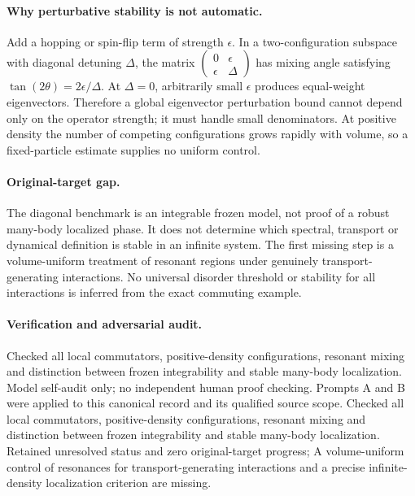\documentclass[11pt]{article}
\begin{document}
\paragraph{Why perturbative stability is not automatic.} Add a hopping or spin-flip term of strength $\epsilon$. In a two-configuration subspace with diagonal detuning $\Delta$, the matrix $\left(\begin{smallmatrix}0&\epsilon\\\epsilon&\Delta\end{smallmatrix}\right)$ has mixing angle satisfying $\tan(2\theta)=2\epsilon/\Delta$. At $\Delta=0$, arbitrarily small $\epsilon$ produces equal-weight eigenvectors. Therefore a global eigenvector perturbation bound cannot depend only on the operator strength; it must handle small denominators. At positive density the number of competing configurations grows rapidly with volume, so a fixed-particle estimate supplies no uniform control.

\paragraph{Original-target gap.} The diagonal benchmark is an integrable frozen model, not proof of a robust many-body localized phase. It does not determine which spectral, transport or dynamical definition is stable in an infinite system. The first missing step is a volume-uniform treatment of resonant regions under genuinely transport-generating interactions. No universal disorder threshold or stability for all interactions is inferred from the exact commuting example.

\paragraph{Verification and adversarial audit.}
Checked all local commutators, positive-density configurations, resonant mixing and distinction between frozen integrability and stable many-body localization. Model self-audit only; no independent human proof checking. Prompts A and B were applied to this canonical record and its qualified source scope. Checked all local commutators, positive-density configurations, resonant mixing and distinction between frozen integrability and stable many-body localization. Retained unresolved status and zero original-target progress; A volume-uniform control of resonances for transport-generating interactions and a precise infinite-density localization criterion are missing.
\end{document}
